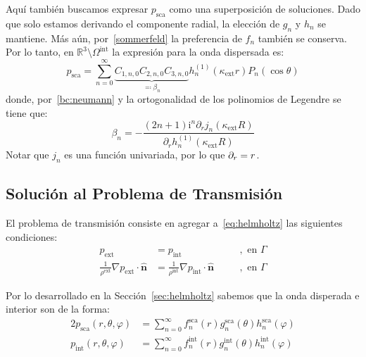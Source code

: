 \documentclass[11pt]{article}
\numberwithin{equation}{section}
\let\d\relax
\newcommand{\d}[1]{\,\frac{\mathrm{d}}{\mathrm{d}#1}}
\def\R{\mathbb{R}}
\def\n{\hat{\textbf{n}}}
\let\i\relax
\def\i{\mathrm{i}}
\def\exterior{\textrm{ext}}
\def\interior{\textrm{int}}
\def\sca{\textrm{sca}}
\begin{document}
\noindent Aquí también buscamos expresar \(p_{\sca}\) como una superposición de
soluciones. Dado que
solo estamos derivando el componente radial, la elección de \(g_n\) y \(h_n\) se
mantiene. Más aún, por~\eqref{sommerfeld} la preferencia de \(f_n\) también se
conserva. Por lo tanto, en \(\R^3\setminus\Omega^{\interior}\) la expresión para
la onda dispersada es:
\begin{equation}
\label{ext:psca:neumann:forma}
	p_{\sca}
	=
	\sum_{n=0}^{\infty}
	\underbrace{C_{1,n,0} C_{2,n,0} C_{3,n,0}}_{\eqqcolon \beta_n}
		h^{(1)}_{n}(\kappa_{\exterior} r)
		P_{n}(\cos\theta)
\end{equation}
donde, por~\eqref{bc:neumann} y la ortogonalidad de los polinomios de Legendre
se tiene que:
\begin{equation}
\label{ext:psca:neumann:coef}
	\beta_n
	=
	-\frac
	{
		(2n+1) \i^n \partial_{r} j_n(\kappa_{\exterior} R)
	}
	{
		\partial_r h_n^{(1)}(\kappa_{\exterior} R)
	}
\end{equation}
Notar que \(j_n\) es una función univariada, por lo que \(\partial_r = \d{r}\).

\subsection{Solución al Problema de Transmisión}
\label{sec:a:transmission}

El problema de transmisión consiste en agregar a~\eqref{eq:helmholtz} las
siguientes condiciones:
\begin{subequations}\label{eq:transmision}
\begin{alignat}{2}
\label{eq:transmision:D}
	p_{\exterior} &= p_{\interior}
	&\quad&, \text{ en } \Gamma\\
\label{eq:transmision:N}
	\frac{1}{\rho^{\exterior}} \nabla p_{\exterior} \cdot \n
	&=
	\frac{1}{\rho^{\interior}} \nabla p_{\interior} \cdot \n
	&\quad&, \text{ en } \Gamma
\end{alignat}
\end{subequations}

Por lo desarrollado en la Sección~\ref{sec:helmholtz} sabemos que la onda
disperada e interior son de la forma:
\begin{alignat}{2}
	p_{\sca}(r,\theta,\varphi)
	&=
	\sum_{n=0}^{\infty} f^{\sca}_{n}(r) g^{\sca}_{n}(\theta) h^{\sca}_{n}(\varphi)
	\\
	p_{\interior}(r,\theta,\varphi)
	&=
	\sum_{n=0}^{\infty} f^{\interior}_{n}(r) g^{\interior}_{n}(\theta) h^{\interior}_{n}(\varphi)
\end{alignat}
\end{document}
